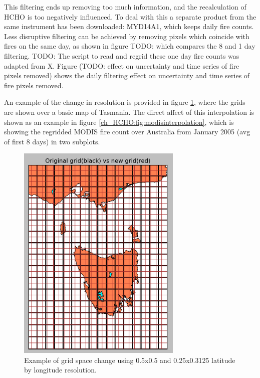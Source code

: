     This filtering ends up removing too much information, and the recalculation of HCHO is too negatively influenced.
    To deal with this a separate product from the same instrument has been downloaded: MYD14A1, which keeps daily fire counts.
    Less disruptive filtering can be achieved by removing pixels which coincide with fires on the same day, as shown in figure TODO: which compares the 8 and 1 day filtering.
    TODO: The script to read and regrid these one day fire counts was adapted from X.
    Figure (TODO: effect on uncertainty and time series of fire pixels removed) shows the daily filtering effect on uncertainty and time series of fire pixels removed.
    
    An example of the change in resolution is provided in figure \ref{ch_HCHO:fig:modisgridspace}, where the grids are shown over a basic map of Tasmania.
    The direct affect of this interpolation is shown as an example in figure \ref{ch_HCHO:fig:modisinterpolation}, which is showing the regridded MODIS fire count over Australia from January 2005 (avg of first 8 days) in two subplots.
    
    \begin{figure}[!htbp]\begin{center}
        \includegraphics[width=0.7\textwidth]{Figures/MODIS_grid_space.png}
        \caption{Example of grid space change using 0.5x0.5 and 0.25x0.3125 latitude by longitude resolution.}
        \label{ch_HCHO:fig:modisgridspace}
      \end{center}\end{figure}
      
